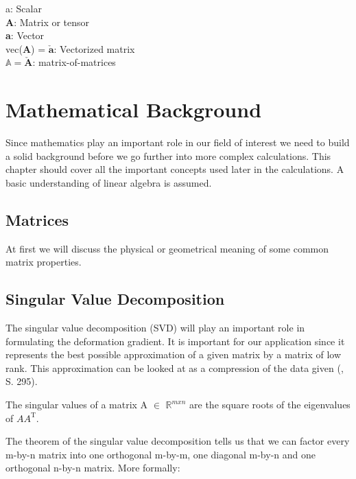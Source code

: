 \begin{addmargin}[1cm]{1cm}
a: Scalar \\
\textbf{A}: Matrix or tensor \\
\textbf{a}: Vector \\
vec(\textbf{A}) = $\boldsymbol{\check{a}}$: Vectorized matrix \\
$\mathbb{A} = \boldsymbol{\check{A}}$: matrix-of-matrices
\end{addmargin}




\section{Mathematical Background}
Since mathematics play an important role in our field of interest we need to build a solid background before we go further into more complex calculations. This chapter should cover all the important concepts used later in the calculations. A basic understanding of linear algebra is assumed.


\subsection{Matrices}
At first we will discuss the physical or geometrical meaning of some common matrix properties.


\subsection{Singular Value Decomposition}

The singular value decomposition (SVD) will play an important role in formulating the deformation gradient. It is important for our application since it represents the best possible approximation of a given matrix by a matrix of low rank. This approximation can be looked at as a compression of the data given (\cite{LiesenMehrmann2015}, S. 295).

\begin{definition}
\label{singular_values}
The singular values of a matrix A $\in$ $\mathbb{R}^{m x n}$ are the square roots of the eigenvalues of $AA^{\mathrm{T}}$.
\end{definition}

The theorem of the singular value decomposition tells us that we can factor every m-by-n matrix into one orthogonal m-by-m, one diagonal m-by-n and one orthogonal n-by-n matrix. More formally:

